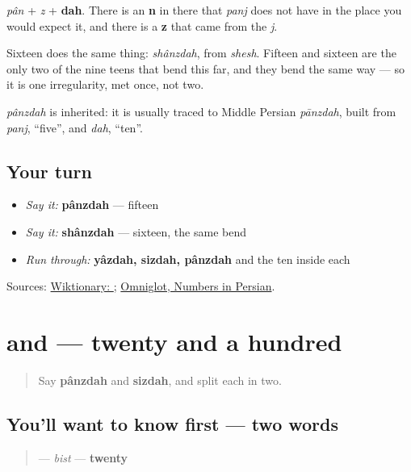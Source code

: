 \emph{pân} + \emph{z} + \textbf{dah}. There is an \textbf{n} in there that \emph{panj} does not have in the place you would expect it, and there is a \textbf{z} that came from the \emph{j}.

Sixteen does the same thing: \emph{shânzdah}, from \emph{shesh}. Fifteen and sixteen are the only two of the nine teens that bend this far, and they bend the same way — so it is one irregularity, met once, not two.

\begin{cousinweb}
\emph{pânzdah} is inherited: it is usually traced to Middle Persian \emph{pānzdah}, built from \emph{panj}, \textquotedblleft{}five\textquotedblright{}, and \emph{dah}, \textquotedblleft{}ten\textquotedblright{}.
\end{cousinweb}

\subsection*{Your turn}
\begin{itemize}
\raggedright
  \item \emph{Say it:} \textbf{pânzdah} — fifteen
  \item \emph{Say it:} \textbf{shânzdah} — sixteen, the same bend
  \item \emph{Run through:} \textbf{yâzdah, sizdah, pânzdah} and the ten inside each
\end{itemize}

\begin{tcolorbox}[breakable,colback=teal!4,colframe=teal!35!black,title={Before you move on}]
Sources: \href{https://en.wiktionary.org/wiki/\%D9\%BE\%D8\%A7\%D9\%86\%D8\%B2\%D8\%AF\%D9\%87}{Wiktionary: }; \href{https://www.omniglot.com/language/numbers/persian.htm}{Omniglot, Numbers in Persian}.
\end{tcolorbox}
\section[\texorpdfstring{\fa{بیست} \fa{صد} (bist sad)}{بیست صد (bist sad)}]{ and  — twenty and a hundred}

\label{lesson:FA-C18-bist-sad}



\begin{quote}
Say \textbf{pânzdah} and \textbf{sizdah}, and split each in two.
\end{quote}

\subsection*{You'll want to know first — two words}
\begin{quote}
\textbf{} — \emph{bist} — \textbf{twenty}
\end{quote}

